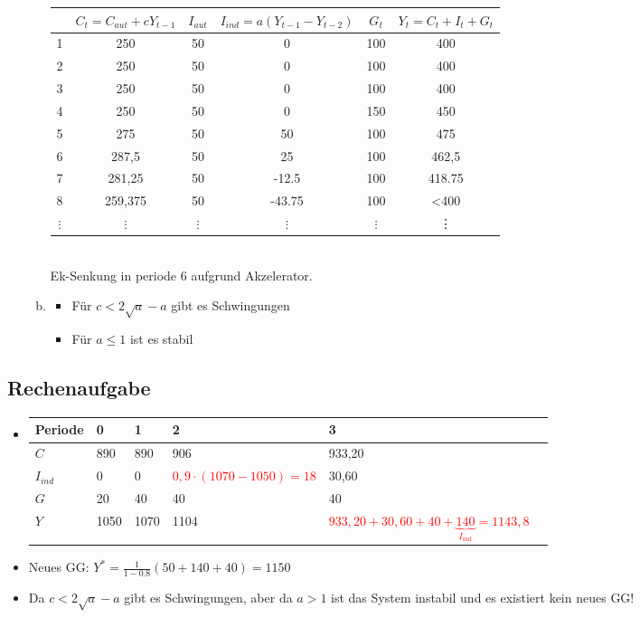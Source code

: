\documentclass{scrartcl}
\begin{document}
\begin{enumerate}[a)]
\begin{enumerate}[a)]
\begin{tabular}{|c|c|c|c|c|c|}
      & $C_t=C_{aut}+c Y_{t-1}$ & $I_{aut}$ & $I_{ind} = a(Y_{t-1} - Y_{t-2})$& $G_t$ & $Y_t =C_{t}+I_{t}+G_{t}$ \\\hline
    1 & 250 & 50 & 0 & 100 & 400 \\
    2 & 250 & 50 & 0 & 100 & 400 \\
    3 & 250 & 50 & 0 & 100 & 400 \\
    4 & 250 & 50 & 0 & 150 & 450 \\
    5 & 275 & 50 & 50 & 100 & 475 \\
    6 & 287,5& 50& 25 & 100 & 462,5 \\
    7 & 281,25& 50& -12.5 & 100 & 418.75 \\
    8 & 259,375& 50& -43.75 & 100 & <400 \\
    $\vdots$ & $\vdots$ & $\vdots$ & $\vdots$ & $\vdots$ &\vdots\\
    \hline
  \end{tabular}\\
Ek-Senkung in periode 6 aufgrund Akzelerator.
\item \begin{itemize}
  \item F\"{u}r $c < 2\sqrt{a}-a$ gibt es Schwingungen
  \item F\"{u}r $a \leq 1$ ist es stabil
\end{itemize}
  \end{enumerate}
\end{enumerate}

\subsection{Rechenaufgabe}
\begin{itemize}
\item
\begin{center}
\begin{tabular}{|l|l|l|l|l|l|}
\hline
Periode      & 0    & 1    & 2    & 3 \\ \hline
$C$          & 890  & 890  & 906  & 933,20          \\ \hline
$I_{ind}$    & 0    & 0    & \textcolor{red}{$0,9\cdot(1070-1050)=18$}     & 30,60       \\ \hline
$G$          & 20   & 40   & 40   & 40       \\ \hline
$Y$          & 1050 & 1070 & 1104 & \textcolor{red}{$933,20+30,60+40+\underbrace{140}_{I_{aut}}=1143,8$}          \\ \hline
\end{tabular}
\end{center}
\item Neues GG: $Y^* = \frac{1}{1-0.8}(50+140+40) = 1150$
\item Da $c < 2\sqrt{a}-a$ gibt es Schwingungen, aber da $a>1$ ist das System instabil und es existiert kein neues GG!
\end{itemize}
\end{document}
